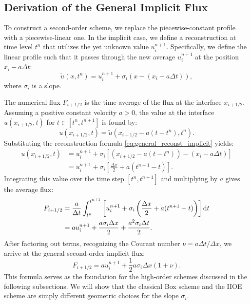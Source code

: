 \subsection{Derivation of the General Implicit Flux}%
\label{sub:derivation_general_flux}

To construct a second-order scheme, we replace the piecewise-constant profile with a piecewise-linear one.
In the implicit case, we define a reconstruction at time level \(t^n\) that utilizes the yet unknown value \(u_{i}^{n+1}\).
Specifically, we define the linear profile such that it passes through the new average \(u_{i}^{n+1}\) at the position \(x_i - a\Delta t\):
\begin{equation}
    \label{eq:general_reconst_implicit}
    \tilde{u}(x, t^n) = u_i^{n+1} + \sigma_i (x - (x_i - a\Delta t)),
\end{equation}
where \(\sigma_i\) is a slope.

The numerical flux \(F_{i+1/2}\) is the time-average of the flux at the interface \(x_{i+1/2}\).
Assuming a positive constant velocity \(a > 0\), the value at the interface \(u(x_{i+1/2}, t)\) for \(t \in [t^n, t^{n+1}]\) is found by:
\begin{equation}
    u(x_{i+1/2}, t) = \tilde{u}(x_{i+1/2} - a(t - t^n), t^n).
\end{equation}
Substituting the reconstruction formula \eqref{eq:general_reconst_implicit} yields:
\begin{equation}
    \begin{split}
    u(x_{i+1/2}, t) &= u_i^{n+1} + \sigma_i \left[ (x_{i+1/2} - a(t - t^n)) - (x_i - a \Delta t) \right] \\
                    &= u_i^{n+1} + \sigma_i \left[ \frac{\Delta x}{2} + a(t^{n+1} - t) \right]. 
    \end{split}
\end{equation}
Integrating this value over the time step $[t^n, t^{n+1}]$ and multiplying by $a$ gives the average flux:
\begin{equation}
    \begin{split}
        F_{i+1/2} &= \frac{a}{\Delta t}
        \int_{t^n}^{t^{n+1}} \left[
    u_i^{n+1} + \sigma_i \left( \frac{\Delta x}{2} + a(t^{n+1} - t) \right)
    \right] \operatorname{d}\! t \\
                  &= a u_i^{n+1} + \frac{a \sigma_i \Delta x}{2} + \frac{a^2 \sigma_i \Delta t}{2}.
    \end{split}
\end{equation}
After factoring out terms, recognizing the Courant number \(\nu = a \Delta t / \Delta x\), we arrive at the general second-order implicit flux:
\begin{equation}
    \label{eq:general_implicit_flux}
    F_{i+1/2} = a u_{i}^{n+1} + \frac{1}{2} a \sigma_i \Delta x (1 + \nu).
\end{equation}
This formula serves as the foundation for the high-order schemes discussed in the following subsections.
We will show that the classical Box scheme and the IIOE scheme are simply different geometric choices for the slope \(\sigma_i\).

